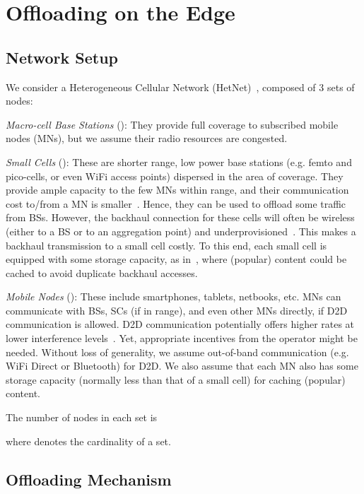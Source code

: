 \documentclass[10pt,conference,letterpaper]{IEEEtran}
\begin{document}
\section{Offloading on the Edge}\label{sec:system-model}
\subsection{Network Setup}
We consider a Heterogeneous Cellular Network (HetNet)~\cite{HetNets-paradigm}, composed of 3 sets of nodes: 

\textit{Macro-cell Base Stations} (): They provide full coverage to subscribed mobile nodes (MNs), but we assume their radio resources are congested. 

\textit{Small Cells} (): These are shorter range, low power base stations (e.g. femto and pico-cells, or even WiFi access points) dispersed in the area of coverage. They provide ample capacity to the few MNs within range, and their communication cost to/from a MN is smaller~\cite{johansson2007cost}. Hence, they can be used to offload some traffic from BSs. However, the backhaul connection for these cells will often be wireless (either to a BS or to an aggregation point) and underprovisioned~\cite{femtocaching}. This makes a backhaul transmission to a small cell costly. To this end, each small cell is equipped with some storage capacity, as in~\cite{femtocaching,poularakis-video-HetNets}, where (popular) content could be cached to avoid duplicate backhaul accesses.

\textit{Mobile Nodes} (): These include smartphones, tablets, netbooks, etc. MNs can communicate with BSs, SCs (if in range), and even other MNs directly, if D2D communication is allowed. D2D communication potentially offers higher rates at lower interference levels~\cite{survey-d2d}. Yet, appropriate incentives from the operator might be needed.  Without loss of generality, we assume out-of-band communication (e.g. WiFi Direct or Bluetooth) for D2D. We also assume that each MN also has some storage capacity (normally less than that of a small cell) for caching (popular) content. 

The number of nodes in each set is

where  denotes the cardinality of a set.

\subsection{Offloading Mechanism}\label{sec:system-communication}
\end{document}
